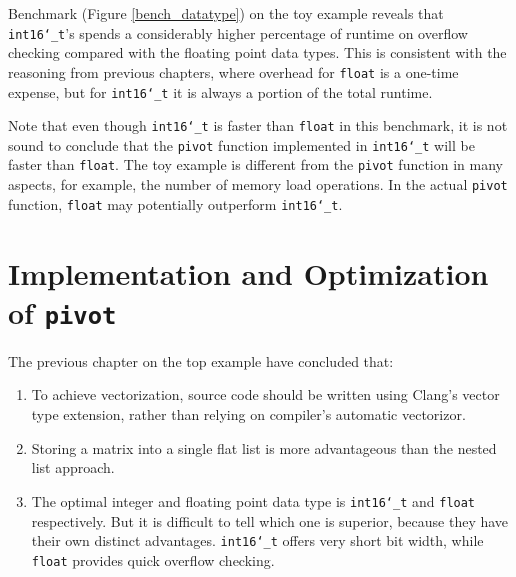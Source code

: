 \documentclass[logo,bsc,singlespacing,parskip]{infthesis}
\newcommand{\dtshort}{\texttt{int16\char`_t}}
\newcommand{\dtfloat}{\texttt{float}}
\newcommand{\pivot}{\texttt{pivot}}
\begin{document}
Benchmark (Figure \ref{bench_datatype}) on the toy example reveals that
\dtshort{}'s spends a considerably higher percentage of runtime on overflow
checking compared with the floating point data types. This is consistent with
the reasoning from previous chapters, where overhead for \dtfloat{} is a
one-time expense, but for \dtshort{} it is always a portion of the total
runtime. 

Note that even though \dtshort{} is faster than \dtfloat{} in this benchmark, it is
not sound to conclude that the \pivot{} function implemented in \dtshort{} will be
faster than \dtfloat{}. The toy example is different from the \pivot{} function in
many aspects, for example, the number of memory load operations. In the actual
\pivot{} function, \dtfloat{} may potentially outperform \dtshort{}. 




\chapter{Implementation and Optimization of \pivot{}}
\label{sec:pivot-impl}
The previous chapter on the top example have concluded that:
\begin{enumerate} 
    \item To achieve vectorization, source code should be written using Clang's
    vector type extension, rather than relying on compiler's automatic
    vectorizor. 
    \item Storing a matrix into a single flat list is more 
    advantageous than the nested list approach.
    \item The optimal integer and floating point data type is \dtshort{} and
    \dtfloat{} respectively. But it is difficult to tell
    which one is superior, because they have their own distinct advantages.
    \dtshort{} offers very short bit width, while \dtfloat{} provides quick overflow
    checking.
\end{enumerate}
\end{document}
